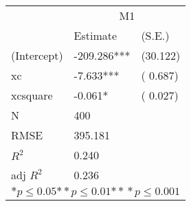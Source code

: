 \begin{tabular}{*{3}{l}}
\hline
                  & \multicolumn{2}{c}{M1}   \tabularnewline
                   &Estimate  &(S.E.)  \tabularnewline
 \hline
 \hline
   (Intercept)     &-209.286***   &   (30.122) \tabularnewline
   xc              &-7.633***   &   ( 0.687) \tabularnewline
   xcsquare        &-0.061*   &   ( 0.027) \tabularnewline
 \hline
 N                 &400       &        \tabularnewline
 RMSE             &395.181         & \tabularnewline
 $R^2$             &0.240         & \tabularnewline
 adj $R^2$         &0.236         & \tabularnewline
 \hline
\hline
 
 \multicolumn{3}{c}{${*  p}\le 0.05$${*\!\!*  p}\le 0.01$${*\!\!*\!\!*  p}\le 0.001$}\tabularnewline
 \end{tabular}